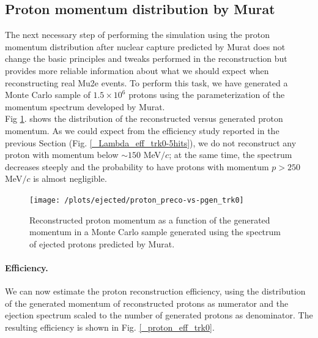 \documentclass[12pt,a4paper,openright, oneside, titlepage]{book} %
\begin{document}
\subsection{Proton momentum distribution by Murat}
The next necessary step of performing the simulation using the proton momentum distribution 
after nuclear capture predicted by Murat does not change the basic principles 
and tweaks performed in the reconstruction but provides more reliable information 
about what we should expect when reconstructing real Mu2e events. 
To perform this task, we have generated a Monte Carlo sample of $1.5\times10^6$ protons 
using the parameterization of the momentum spectrum developed by Murat.\\
Fig \ref{_proton_preco-vs-pgen_trk0}. shows
the distribution of the reconstructed versus generated proton momentum. 
As we could expect from the efficiency study reported in the previous Section (Fig. \ref{_Lambda_eff_trk0-5hits}), 
we do not reconstruct any proton with momentum below $\sim 150$ MeV$/c$; 
at the same time, the spectrum decreases steeply and the probability to have 
protons with momentum $p > 250$ MeV$/c$ is almost negligible.

\begin{figure}[!htb]
\centering
\texttt{[image: /plots/ejected/proton\_preco-vs-pgen\_trk0]}
\caption[Reconstructed vs generated momentum (ejected protons)]
{Reconstructed proton momentum as a function of the generated momentum 
in a Monte Carlo sample generated
using the spectrum of ejected protons predicted by Murat.}
\label{_proton_preco-vs-pgen_trk0}
\end{figure}

\paragraph{Efficiency.} We can now estimate the proton reconstruction efficiency, 
using the distribution of the generated momentum of reconstructed protons as numerator 
and the ejection spectrum scaled to the number of generated protons as denominator. 
The resulting efficiency is shown in Fig. \ref{_proton_eff_trk0}.

\end{document}

